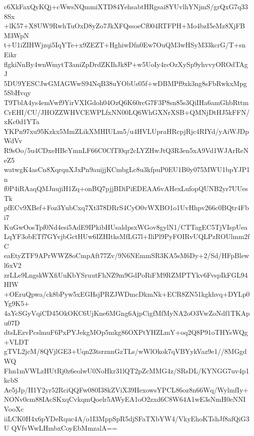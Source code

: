 c6XkFaxQyKQj+cWwsNQmmiXTD84YehsabtHRgsai8YUvlhYNjmS/grQxG7q338Sx
+lK57+X8UW9RwhTuOxD8yZo7JkXFQssoeCf004RTFPH+Mo4bzI5eMz8XjFBM3WpN
t+U1iZIHWjzqi5IqYTe+x9ZEZT+HghiwDfn0Ew7OuQM3wHSyM33kcrG/T+snEikr
flgkiNnBy4wnWmytT3aniZpDrdZKIhJk8P+w5UoIy4rcOzXySp9yhvvyOROdTAgJ
5DU9YESCJwGMAGWwS94NqB38uYObUs05f+wDBMPf9xk3ng8sFbRwkxMpg5SbHvqy
T9TblA4ys4emVwf9YirVXIGdoh04OzQ6K60rcG7F3P8sn85s3QiIHa6amGhbRttm
CrEHI/CU/JHOZZWHVCEWPLfxNN00LQ6WhGXNrXSB+QMNjDtHJ5kFFN/xKc0d1YTa
YKPn97xu95Kzkx5MmZLikXMHIULm5/u4HVLUpraHRcpjRjc4RIYd/yAiWJDpWdVv
R9sOo/5u4CDxeHBcYmnLF66C0CfTl0qr2cLYZHwJtQ3R3en5xA9Vd1WJArReNeZ5
watwgK4asCn8XqrqnXJxPn9auijjKCmbgLc8u3kfpuP0EU1B0y075MWU1bpYJP1n
f0P4iRAaqQMJnujiH1Zq+onBQ7pjjBDiPiEDEAA6vAHexLufopQUNB2yr7UUesTk
pfECv9XBef+Foz3YubCxq7Xt378DRrS4CyO0vWXBO1o1UvHhpv266c0BQtr4Fbi7
KuGwOosTpf0Nd4esi5AdE9IPkibHUsaldpsxWGov8gylN1/CTTagEC5TjVIspUea
LqYF3obETf7GYvjbGctHUw6IZHItksMfLG7l+IliPl9PyFOIRvUQLPzROUlmm2fC
eaEtyZTF9APrWWZ8oCmpAft77Zv/9N6NEmmSR3KA5sM6Dy+2/Sd/HFpBlewl6xV2
zrLLe9LngskWXfiUuKbYSruutFhNZ9m9GdPoRiFM9RZMPTYkv6FvspIkFGL94HIW
+OEruQpwa/ck8bPyw5xEGHsjPRZJWDmcDkmNk+ECR8ZN51kgkhvq+DYLp0Yg9K5+
4aYcSGyVqiCD45OkOKC6UjKne6MGng6AjpCigfMfMyNA2oO3VwZoNdf1TKApu07D
dtsLEzvPcslmuF6PxPYJekgMOp5mkg86OXPtYHZLmY+oq2Q8P91oTHYsWQg+VLDT
gTVL2jcM/8QVjlGE3+Uqn23tsrznnGzTLs/wWlOkok7qVBYykVaz9e1//8MGgdWQ
Fhn1mVWLzHUtRj0z6eolwU0NoHkr31lQT2pZcMMG4z/SRsDL/KYNGG7uv4p1kcbS
Ae5jJp/H1Y2yr52RciQQFw080I38kZViX39HexowsYPCL86oz8n66Wq/WylmfIy+
NONv0cm88IAcSKxqCvkqmQoelr5AWyEA1oO2zxd6C8W64A1wE3sNmH0eNNIVooXc
iiLCK0H4x6pYDeRquc4A/o1I3MppSpR5djSFaTXbYW4/VkyEhoKTshJf8afQiG3U
QVfvWwLHmbxCoyEbMmzalA==
